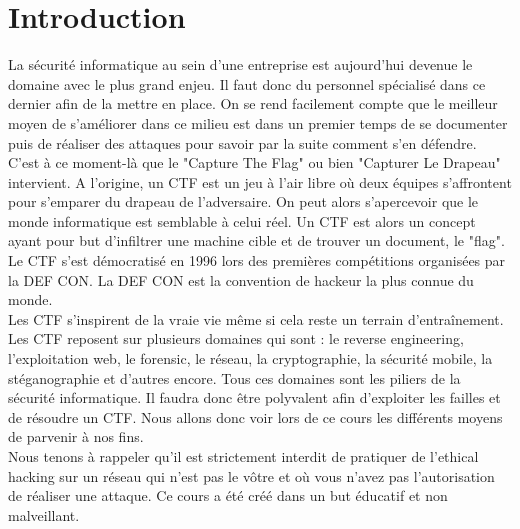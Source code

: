 \chapter{Introduction}


La sécurité informatique au sein d’une entreprise est aujourd'hui devenue le domaine avec le plus grand enjeu. Il faut donc du personnel spécialisé dans ce dernier afin de la mettre en place. On se rend facilement compte que le meilleur moyen de s’améliorer dans ce milieu est dans un premier temps de se documenter puis de réaliser des attaques pour savoir par la suite comment s'en défendre. C’est à ce moment-là que le "Capture The Flag" ou bien "Capturer Le Drapeau" intervient. A l’origine, un CTF est un jeu à l’air libre où deux équipes s’affrontent pour s’emparer du drapeau de l’adversaire. On peut alors s’apercevoir que le monde informatique est semblable à celui réel. Un CTF est alors un concept ayant pour but d’infiltrer une machine cible et de trouver un document, le "flag". Le CTF s’est démocratisé en 1996 lors des premières compétitions organisées par la DEF CON. La DEF CON est la convention de hackeur la plus connue du monde. \\
Les CTF s’inspirent de la vraie vie même si cela reste un terrain d'entraînement. Les CTF reposent sur plusieurs domaines qui sont : le reverse engineering, l’exploitation web, le forensic, le réseau, la cryptographie, la sécurité mobile, la stéganographie et d'autres encore.
Tous ces domaines sont les piliers de la sécurité informatique. Il faudra donc être polyvalent afin d’exploiter les failles et de résoudre un CTF. Nous allons donc voir lors de ce cours les différents moyens de parvenir à nos fins.\\
Nous tenons à rappeler qu'il est strictement interdit de pratiquer de l'ethical hacking sur un réseau qui n'est pas le vôtre et où vous n'avez pas l'autorisation de réaliser une attaque. Ce cours a été créé dans un but éducatif et non malveillant.